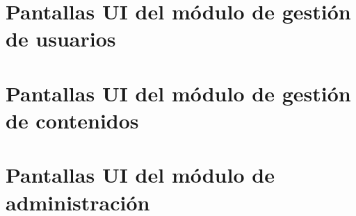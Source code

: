 \section{Pantallas UI del módulo de gestión de usuarios}





\clearpage







\clearpage









\clearpage
\section{Pantallas UI del módulo de gestión de contenidos}











\clearpage
\section{Pantallas UI del módulo de administración}






\clearpage
